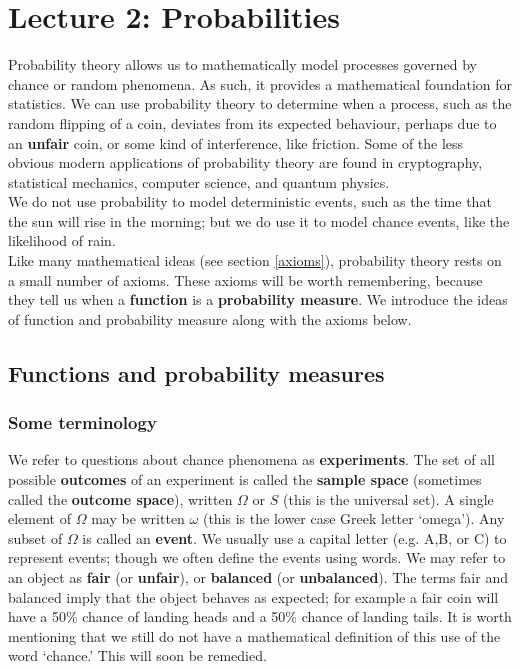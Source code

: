 \chapter{Lecture 2: Probabilities}
Probability theory allows us to mathematically model processes governed by chance or random phenomena. As such, it provides a mathematical foundation for statistics. We can use probability theory to determine when a process, such as the random flipping of a coin, deviates from its expected behaviour, perhaps due to an \textbf{unfair} coin, or some kind of interference, like friction. Some of the less obvious modern applications of probability theory are found in cryptography, statistical mechanics, computer science, and quantum physics. \\

\noindent We do not use probability to model deterministic events, such as the time that the sun will rise in the morning; but we do use it to model chance events, like the likelihood of rain.  \\

\noindent Like many mathematical ideas (see section \ref{axioms}), probability theory rests on a small number of axioms. These axioms will be worth remembering, because they tell us when a \textbf{function} is a \textbf{probability measure}. We introduce the ideas of function and probability measure along with the axioms below.
 
\section{Functions and probability measures}
\subsection{Some terminology}
We refer to questions about chance phenomena as \textbf{experiments}. The set of all possible \textbf{outcomes} of an experiment is called the \textbf{sample space} (sometimes called the \textbf{outcome space}), written $\Omega$ or $S$ \label{symbS} (this is the universal set). A single element of $\Omega$ may be written $\omega$ \label{symbomega} (this is the lower case Greek letter `omega'). Any subset of $\Omega$ is called an \textbf{event}. We usually use a capital letter (e.g. A,B, or C) to represent events; though we often define the events using words. We may refer to an object as \textbf{fair} (or \textbf{unfair}), or \textbf{balanced} (or \textbf{unbalanced}). The terms fair and balanced imply that the object behaves as expected; for example a fair coin will have a 50\% chance of landing heads and a 50\% chance of landing tails. It is worth mentioning that we still do not have a mathematical definition of this use of the word `chance.' This will soon be remedied. \label{unfair} \label{balanced} \label{experiment} \label{sample space} \label{outcome} \label{event}

